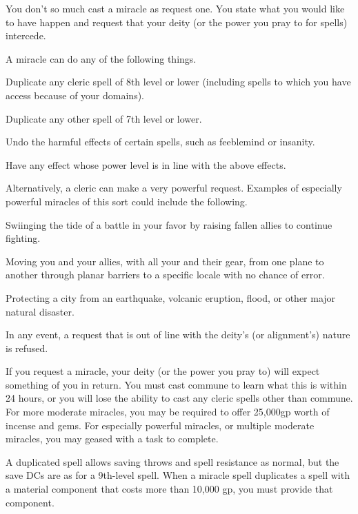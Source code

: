 \begin{spelleffect}
  You don't so much cast a miracle as request one. You state what you would like to have happen and request that your deity (or the power you pray to for spells) intercede.
  \par A miracle can do any of the following things.
  \begin{itemize*}
    \item Duplicate any cleric spell of 8th level or lower (including spells to which you have access because of your domains). 
    \item Duplicate any other spell of 7th level or lower.
    \item Undo the harmful effects of certain spells, such as feeblemind or insanity.
    \item Have any effect whose power level is in line with the above effects.
  \end{itemize*}
  \par Alternatively, a cleric can make a very powerful request. Examples of especially powerful miracles of this sort could include the following.
  \begin{itemize*}
    \item Swiinging the tide of a battle in your favor by raising fallen allies to continue fighting.
    \item Moving you and your allies, with all your and their gear, from one plane to another through planar barriers to a specific locale with no chance of error.
    \item Protecting a city from an earthquake, volcanic eruption, flood, or other major natural disaster.
  \end{itemize*}
  \par In any event, a request that is out of line with the deity's (or alignment's) nature is refused.
\end{spelleffect}
\begin{spellnotes}
  If you request a miracle, your deity (or the power you pray to) will expect something of you in return. You must cast commune to learn what this is within 24 hours, or you will lose the ability to cast any cleric spells other than commune. For more moderate miracles, you may be required to offer 25,000gp worth of incense and gems. For especially powerful miracles, or multiple moderate miracles, you may geased with a task to complete.
  \par A duplicated spell allows saving throws and spell resistance as normal, but the save DCs are as for a 9th-level spell. When a miracle spell duplicates a spell with a material component that costs more than 10,000 gp, you must provide that component.
\end{spellnotes}

